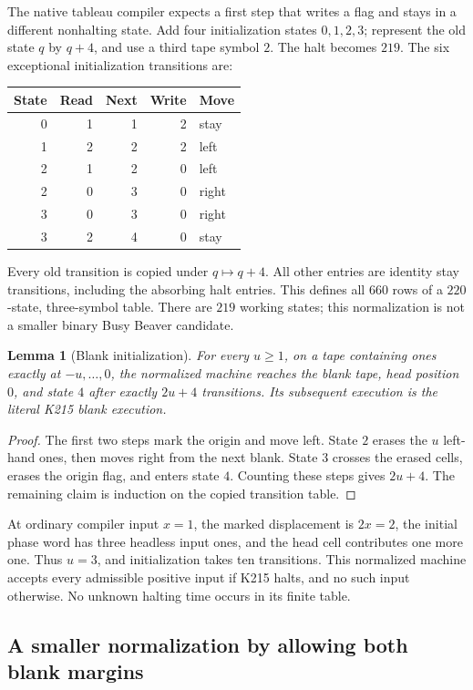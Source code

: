 \documentclass[11pt]{article}
\newtheorem{lemma}[theorem]{Lemma}
\theoremstyle{remark}\newtheorem{remark}[theorem]{Remark}
\begin{document}
The native tableau compiler expects a first step that writes a flag
and stays in a different nonhalting state. Add four initialization
states $0,1,2,3$; represent the old state $q$ by $q+4$, and use a third
tape symbol $2$. The halt becomes $219$. The six exceptional
initialization transitions are:
\begin{center}
\begin{tabular}{@{}rrrrl@{}}
\toprule
State & Read & Next & Write & Move\\\midrule
0&1&1&2&stay\\
1&2&2&2&left\\
2&1&2&0&left\\
2&0&3&0&right\\
3&0&3&0&right\\
3&2&4&0&stay\\\bottomrule
\end{tabular}
\end{center}
Every old transition is copied under $q\mapsto q+4$. All other entries
are identity stay transitions, including the absorbing halt entries.
This defines all $660$ rows of a $220$-state, three-symbol table.
There are $219$ working states; this normalization is not a smaller
binary Busy Beaver candidate.

\begin{lemma}[Blank initialization]\label{lem:normalize}
For every $u\ge1$, on a tape containing ones exactly at
$-u,\ldots,0$, the normalized machine reaches the blank tape, head
position $0$, and state $4$ after exactly $2u+4$ transitions. Its
subsequent execution is the literal K215 blank execution.
\end{lemma}
\begin{proof}
The first two steps mark the origin and move left. State $2$ erases
the $u$ left-hand ones, then moves right from the next blank. State
$3$ crosses the erased cells, erases the origin flag, and enters state
$4$. Counting these steps gives $2u+4$. The remaining claim is induction
on the copied transition table.
\end{proof}

At ordinary compiler input $x=1$, the marked displacement is $2x=2$,
the initial phase word has three headless input ones, and the head
cell contributes one more one. Thus $u=3$, and initialization takes
ten transitions. This normalized machine accepts every admissible
positive input if K215 halts, and no such input otherwise. No unknown
halting time occurs in its finite table.

\subsection{A smaller normalization by allowing both blank margins}
\end{document}
